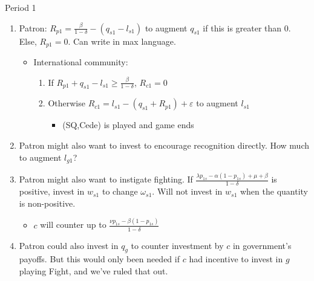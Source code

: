\documentclass[12pt]{article}
\newcommand{\ve}{\varepsilon}
\newcommand{\de}{\delta}
\begin{document}
Period 1
\begin{enumerate}
	\item Patron: $R_{p1} = \frac{\beta}{1-\de} - \left(q_{s1} - l_{s1}\right)$ to augment $q_{s1}$ if this is greater than 0. Else, $R_{p1} = 0$. Can write in max language.
		\begin{itemize}
			\item International community: 
				\begin{enumerate}
					\item If $R_{p1} + q_{s1} - l_{s1} \geq \frac{\beta}{1-\de}$, $R_{c1} =0$
					\item Otherwise $R_{c1} = l_{s1} - \left(q_{s1} + R_{p1} \right) + \ve$ to augment $l_{s1}$
						\begin{itemize}
							\item (SQ,Cede) is played and game ends
						\end{itemize}
				\end{enumerate}
		\end{itemize}	
	\item Patron might also want to invest to encourage recognition directly. How much to augment $l_{g1}$?	
	\item Patron might also want to instigate fighting. If $\frac{\lambda p_{1s} - \alpha (1-p_{1s}) + \mu + \beta}{1 - \de}$ is positive, invest in $w_{s1}$ to change $\omega_{s1}$. Will not invest in $w_{s1}$ when the quantity is non-positive.
		\begin{itemize}
			\item $c$ will counter up to $\frac{\nu p_{1s} - \beta (1-p_{1s})}{1 -\de}$
		\end{itemize}
	\item Patron could also invest in $q_g$ to counter investment by $c$ in government's payoffs. But this would only been needed if $c$ had incentive to invest in $g$ playing Fight, and we've ruled that out.
\end{enumerate}
\end{document}
